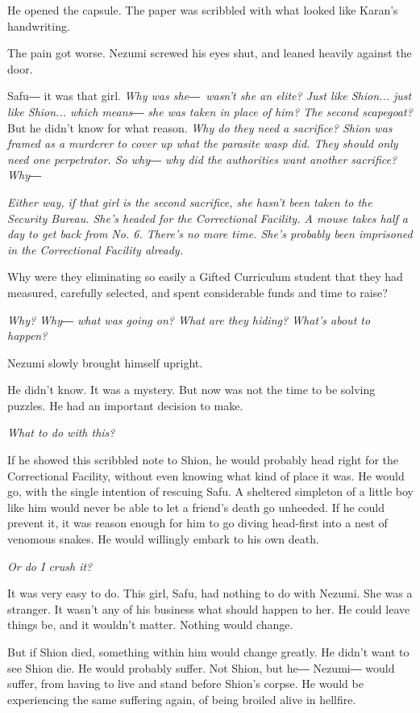 He opened the capsule. The paper was scribbled with what looked like
Karan's handwriting.


The pain got worse. Nezumi screwed his eyes shut, and leaned heavily
against the door.

Safu― it was that girl. \emph{Why was she―~wasn't she an elite? Just like
	Shion... just like Shion... which means― she was taken in place of him?
	The second scapegoat?} But he didn't know for what reason. \emph{Why do they
	need a sacrifice? Shion was framed as a murderer to cover up what the
	parasite wasp did. They should only need one perpetrator. So why― why
	did the authorities want another sacrifice? Why―}

\emph{Either way, if that girl is the second sacrifice, she hasn't been taken
	to the Security Bureau. She's headed for the Correctional Facility. A
	mouse takes half a day to get back from No. 6. There's no more time.
	She's probably been imprisoned in the Correctional Facility already.}

Why were they eliminating so easily a Gifted Curriculum student that
they had measured, carefully selected, and spent considerable funds and
time to raise?

\emph{Why? Why― what was going on? What are they hiding? What's about to
	happen?}

Nezumi slowly brought himself upright.

He didn't know. It was a mystery. But now was not the time to be solving
puzzles. He had an important decision to make.

\emph{What to do with this?}

If he showed this scribbled note to Shion, he would probably head right
for the Correctional Facility, without even knowing what kind of place
it was. He would go, with the single intention of rescuing Safu. A
sheltered simpleton of a little boy like him would never be able to let
a friend's death go unheeded. If he could prevent it, it was reason
enough for him to go diving head-first into a nest of venomous snakes.
He would willingly embark to his own death.

\emph{Or do I crush it?}

It was very easy to do. This girl, Safu, had nothing to do with Nezumi.
She was a stranger. It wasn't any of his business what should happen to
her. He could leave things be, and it wouldn't matter. Nothing would
change.

But if Shion died, something within him would change greatly. He didn't
want to see Shion die. He would probably suffer. Not Shion, but he―
Nezumi― would suffer, from having to live and stand before Shion's
corpse. He would be experiencing the same suffering again, of being
broiled alive in hellfire.

